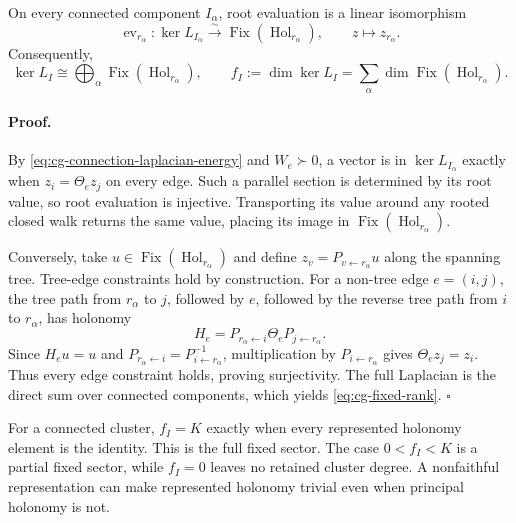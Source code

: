 On every connected component \(I_\alpha\), root evaluation is a linear
isomorphism
\begin{equation}
\operatorname{ev}_{r_\alpha}:\ker L_{I_\alpha}
\xrightarrow{\sim}
\operatorname{Fix}(\operatorname{Hol}_{r_\alpha}),
\qquad z\longmapsto z_{r_\alpha}.
\label{eq:cg-kernel-holonomy-isomorphism}
\end{equation}
Consequently,
\begin{equation}
\ker L_I\cong
\bigoplus_\alpha\operatorname{Fix}(\operatorname{Hol}_{r_\alpha}),
\qquad
f_I:=\dim\ker L_I
=\sum_\alpha\dim\operatorname{Fix}
(\operatorname{Hol}_{r_\alpha}).
\label{eq:cg-fixed-rank}
\end{equation}

\paragraph{Proof.}
By \eqref{eq:cg-connection-laplacian-energy} and \(W_e\succ0\), a vector is
in \(\ker L_{I_\alpha}\) exactly when
\(z_i=\Theta_ez_j\) on every edge. Such a parallel section is determined by
its root value, so root evaluation is injective. Transporting its value
around any rooted closed walk returns the same value, placing its image in
\(\operatorname{Fix}(\operatorname{Hol}_{r_\alpha})\).

Conversely, take
\(u\in\operatorname{Fix}(\operatorname{Hol}_{r_\alpha})\) and define
\(z_v=P_{v\leftarrow r_\alpha}u\) along the spanning tree. Tree-edge
constraints hold by construction. For a non-tree edge \(e=(i,j)\), the tree
path from \(r_\alpha\) to \(j\), followed by \(e\), followed by the reverse
tree path from \(i\) to \(r_\alpha\), has holonomy
\begin{equation}
H_e=P_{r_\alpha\leftarrow i}\Theta_e
P_{j\leftarrow r_\alpha}.
\label{eq:cg-fundamental-cycle-holonomy}
\end{equation}
Since \(H_eu=u\) and
\(P_{r_\alpha\leftarrow i}=P_{i\leftarrow r_\alpha}^{-1}\), multiplication
by \(P_{i\leftarrow r_\alpha}\) gives
\(\Theta_ez_j=z_i\). Thus every edge constraint holds, proving surjectivity.
The full Laplacian is the direct sum over connected components, which yields
\eqref{eq:cg-fixed-rank}. \(\square\)

For a connected cluster, \(f_I=K\) exactly when every represented holonomy
element is the identity. This is the full fixed sector. The case
\(0<f_I<K\) is a partial fixed sector, while \(f_I=0\) leaves no retained
cluster degree. A nonfaithful representation can make represented holonomy
trivial even when principal holonomy is not. 

